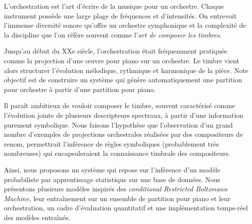 \documentclass[12pt]{report}
\begin{document}
\begin{doublespacing}
L'orchestration est l'art d'écrire de la musique pour un orchestre.
Chaque instrument possède une large plage de fréquences et d'intensités. On entrevoit l'immense diversité sonore qu'offre un orchestre symphonique et la complexité de la discipline que l'on réfère souvent comme l'\textit{art de composer les timbres}.

Jusqu'au début du XXe siècle, l'orchestration était fréquemment pratiquée comme la projection d'une œuvre pour piano sur un orchestre.
Le timbre vient alors structurer l'évolution mélodique, rythmique et harmonique de la pièce.
Note objectif est de construire un système qui génère automatiquement une partition pour orchestre à partir d'une partition pour piano.

Il paraît ambitieux de vouloir composer le timbre, souvent caractérisé comme l'évolution jointe de plusieurs descripteurs spectraux, à partir d'une information purement symbolique.
Nous faisons l'hypothèse que l'observation d'un grand nombre d'exemples de projections orchestrales réalisées par des compositeurs de renom, permettrait l'inférence de règles symboliques (probablement très nombreuses) qui encapsuleraient la connaissance timbrale des compositeurs.

Ainsi, nous proposons un système qui repose sur l'inférence d'un modèle probabiliste par apprentissage statistique sur une base de données.
Nous présentons plusieurs modèles inspirés des \textit{conditional Restricted Boltzmann Machine}, leur entraînement sur un ensemble de partition pour piano et leur orchestration, un cadre d'évaluation quantitatif et une implémentation temps-réel des modèles entraînés.

\end{doublespacing}
\end{document}
